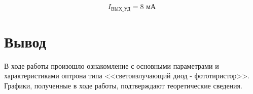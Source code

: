 \[
I_\text{ВЫХ\_УД} = 8 \text{ мА}
\]

\section{Вывод}

В ходе работы произошло ознакомление с основными параметрами и характеристиками оптрона типа <<светоизлучающий диод - фототиристор>>.
Графики, полученные в ходе работы, подтверждают теоретические сведения.

